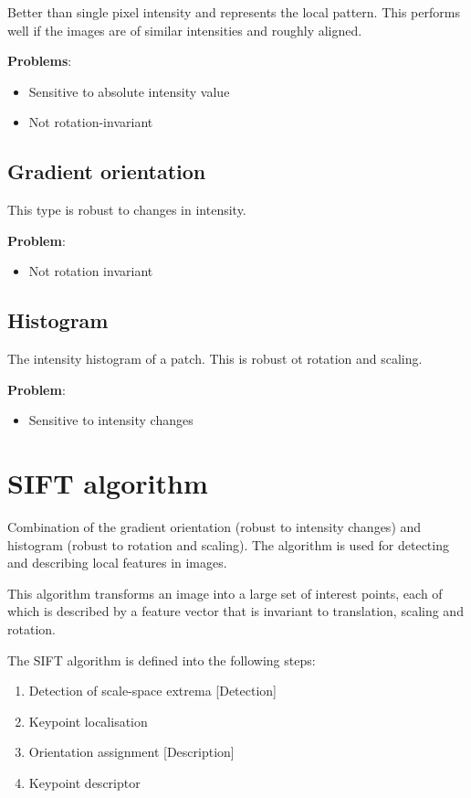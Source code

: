 \documentclass{report}
\begin{document}
Better than single pixel intensity and represents the local pattern. This
performs well if the images are of similar intensities and roughly aligned. 

\textbf{Problems}:
\begin{itemize}
    \item Sensitive to absolute intensity value 
    \item Not rotation-invariant 
\end{itemize}

\subsection{Gradient orientation}

This type is robust to changes in intensity. 

\textbf{Problem}:
\begin{itemize}
    \item Not rotation invariant 
\end{itemize}

\subsection{Histogram}

The intensity histogram of a patch. This is robust ot rotation and scaling. 

\textbf{Problem}:
\begin{itemize}
    \item Sensitive to intensity changes 
\end{itemize}

\section{SIFT algorithm}

Combination of the gradient orientation (robust to intensity changes) and
histogram (robust to rotation and scaling). The algorithm is used for detecting
and describing local features in images. 

This algorithm transforms an image into a large set of interest points, each of which is
described by a feature vector that is invariant to translation, scaling and
rotation.

The SIFT algorithm is defined into the following steps:
\begin{enumerate}
    \item Detection of scale-space extrema [Detection]
    \item Keypoint localisation 
    \item Orientation assignment [Description] 
    \item Keypoint descriptor 
\end{enumerate}
\end{document}
